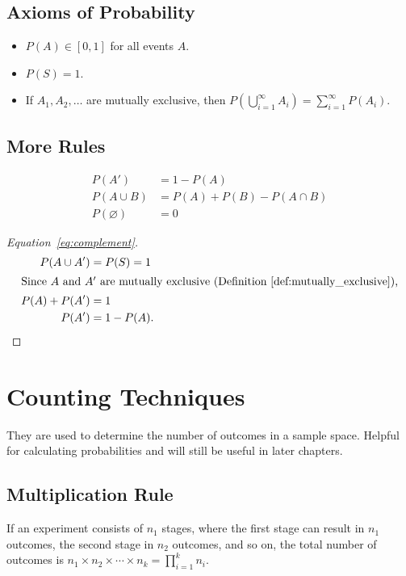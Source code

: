 \documentclass{article}
\begin{document}
\subsection{Axioms of Probability}
\begin{itemize}
    \item $P(A) \in [0, 1]$ for all events $A$.
    \item $P(S) = 1$.
    \item If $A_1, A_2, \ldots$ are mutually exclusive, then $P\left(\bigcup_{i=1}^\infty A_i\right) = \sum_{i=1}^\infty P(A_i)$.
\end{itemize}

\subsection{More Rules}
\begin{align}
  P(A') &= 1 - P(A) \label{eq:complement} \\
    P(A \cup B) &= P(A) + P(B) - P(A \cap B) \\
    P(\varnothing) &= 0
\end{align}

\begin{proof}[Equation~\ref{eq:complement}]
\begin{align*}
    P(A \cup A') &= P(S) = 1 \\
    \intertext{Since $A$ and $A'$ are mutually exclusive (Definition~\ref{def:mutually_exclusive}),}
    P(A) + P(A') &= 1 \\
    P(A') &= 1 - P(A).
\end{align*}
\end{proof}

\newpage
\section{Counting Techniques}

They are used to determine the number of outcomes in a sample space. Helpful for calculating probabilities and will still be useful in later chapters.

\subsection{Multiplication Rule}
\begin{definition}
If an experiment consists of $n_1$ stages, where the first stage can result in $n_1$ outcomes, the second stage in $n_2$ outcomes, and so on, the total number of outcomes is $n_1 \times n_2 \times \cdots \times n_k = \prod_{i=1}^k n_i$.
\end{definition}
\end{document}
